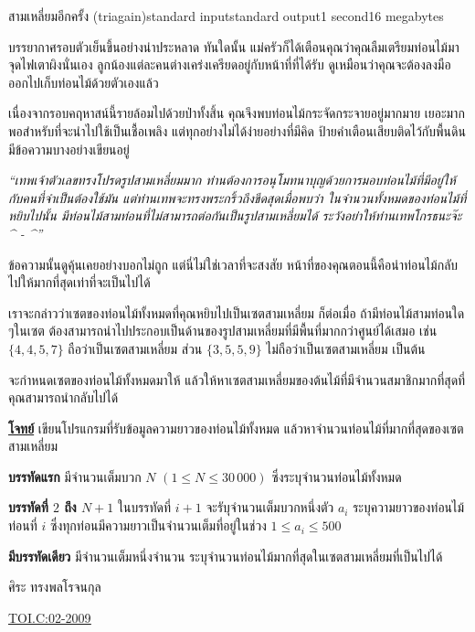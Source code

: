\documentclass[11pt,a4paper]{article}
\begin{document}
\begin{problem}{สามเหลี่ยมอีกครั้ง (triagain)}{standard input}{standard output}{1 second}{16 megabytes}

     บรรยากาศรอบตัวเย็นขึ้นอย่างน่าประหลาด ทันใดนั้น แม่ครัวก็ได้เตือนคุณว่าคุณลืมเตรียมท่อนไม้มาจุดไฟเตาผิงนั่นเอง ลูกน้องแต่ละคนต่างเคร่งเครียดอยู่กับหน้าที่ที่ได้รับ ดูเหมือนว่าคุณจะต้องลงมือออกไปเก็บท่อนไม้ด้วยตัวเองแล้ว   

      เนื่องจากรอบคฤหาสน์นี้รายล้อมไปด้วยป่าทั้งสิ้น คุณจึงพบท่อนไม้กระจัดกระจายอยู่มากมาย เยอะมากพอสำหรับที่จะนำไปใช้เป็นเชื้อเพลิง แต่ทุกอย่างไม่ได้ง่ายอย่างที่มีคิด ป้ายคำเตือนเสียบติดไว้กับพื้นดิน มีข้อความบางอย่างเขียนอยู่

\begin{center}
    \textit{  “เทพเจ้าตัวเลขทรงโปรดรูปสามเหลี่ยมมาก ท่านต้องการอนุโมทนาบุญด้วยการมอบท่อนไม้ที่มีอยู่ให้กับคนที่จำเป็นต้องใช้มัน แต่ท่านเทพจะทรงพระกริ้วถึงขีดสุดเมื่อพบว่า ในจำนวนทั้งหมดของท่อนไม้ที่หยิบไปนั้น มีท่อนไม้สามท่อนที่ไม่สามารถต่อกันเป็นรูปสามเหลี่ยมได้ ระวังอย่าให้ท่านเทพโกรธนะจ๊ะ \^{} - \^{}\””}
\end{center}

      ข้อความนั้นดูคุ้นเคยอย่างบอกไม่ถูก แต่นี่ไม่ใช่เวลาที่จะสงสัย หน้าที่ของคุณตอนนี้คือนำท่อนไม้กลับไปให้มากที่สุดเท่าที่จะเป็นไปได้

      เราจะกล่าวว่าเซตของท่อนไม้ทั้งหมดที่คุณหยิบไปเป็นเซตสามเหลี่ยม ก็ต่อเมื่อ ถ้ามีท่อนไม้สามท่อนใด ๆในเซต ต้องสามารถนำไปประกอบเป็นด้านของรูปสามเหลี่ยมที่มีพื้นที่มากกว่าศูนย์ได้เสมอ  เช่น $\{4,4,5,7\}$ ถือว่าเป็นเซตสามเหลี่ยม ส่วน $\{3,5,5,9\}$ ไม่ถือว่าเป็นเซตสามเหลี่ยม เป็นต้น

      จะกำหนดเซตของท่อนไม้ทั้งหมดมาให้ แล้วให้หาเซตสามเหลี่ยมของต้นไม้ที่มีจำนวนสมาชิกมากที่สุดที่คุณสามารถนำกลับไปได้

\bigskip
\underline{\textbf{โจทย์}}  เขียนโปรแกรมที่รับข้อมูลความยาวของท่อนไม้ทั้งหมด แล้วหาจำนวนท่อนไม้ที่มากที่สุดของเซตสามเหลี่ยม

\InputFile

\textbf{บรรทัดแรก} มีจำนวนเต็มบวก $N$ $(1 \leq N \leq 30\,000)$ ซึ่งระบุจำนวนท่อนไม้ทั้งหมด

\textbf{บรรทัดที่ $2$ ถึง $N+1$} ในบรรทัดที่ $i+1$ จะรับุจำนวนเต็มบวกหนึ่งตัว $a_i$ ระบุความยาวของท่อนไม้ท่อนที่ $i$ ซึ่งทุกท่อนมีความยาวเป็นจำนวนเต็มที่อยู่ในช่วง $1 \leq a_i \leq 500$ 


\OutputFile

\textbf{มีบรรทัดเดียว} มีจำนวนเต็มหนึ่งจำนวน ระบุจำนวนท่อนไม้มากที่สุดในเซตสามเหลี่ยมที่เป็นไปได้

\Examples

\begin{example}
%
\end{example}


\Source

ศิระ ทรงพลโรจนกุล

\underline{\href{http://www.thailandoi.org/toi.c/02-2009}{TOI.C:02-2009}}

\end{problem}
\end{document}
